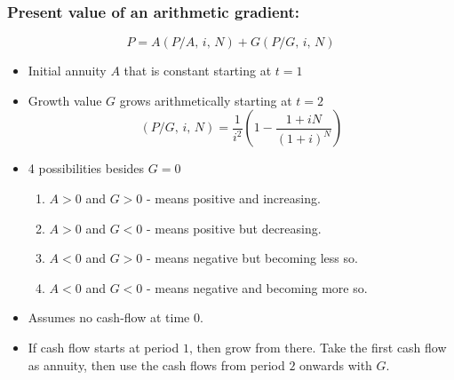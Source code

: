     \subsubsection{Present value of an arithmetic gradient:}
    \begin{definition}
        \begin{equation}
            P = A \left(P/A, \, i, \, N\right) + G \left(P/G, \, i, \, N\right)
        \end{equation}
        \begin{itemize}
            \item Initial annuity $A$ that is constant starting at $t=1$
            \item Growth value $G$ grows arithmetically starting at $t=2$
            \begin{equation*}
                \left(P/G, \, i, \, N\right) = \frac{1}{i^2} \left(1 - \frac{1 + iN}{(1+i)^N}\right)
            \end{equation*}
            \item 4 possibilities besides $G=0$
            \begin{enumerate}
                \item \( A > 0 \) and \( G > 0 \) - means positive and increasing.
                \item \( A > 0 \) and \( G < 0 \) - means positive but decreasing.
                \item \( A < 0 \) and \( G > 0 \) - means negative but becoming less so.
                \item \( A < 0 \) and \( G < 0 \) - means negative and becoming more so.
            \end{enumerate}
        \end{itemize}
    \end{definition}

    \begin{warning}
        \begin{itemize}
            \item Assumes no cash-flow at time $0$.
            \item If cash flow starts at period $1$, then grow from there. Take the first cash flow as annuity, then use the cash flows from period $2$ onwards with $G$.
        \end{itemize}
    \end{warning}
    
